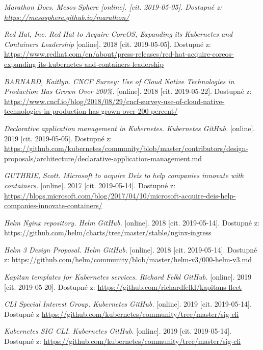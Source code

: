 \begin{thebibliography}{10}
	\emph{Marathon Docs. Mesos Sphere [online]. [cit. 2019-05-05]. Dostupné z: \url{https://mesosphere.github.io/marathon/}}
    
    \emph{Red Hat, Inc. Red Hat to Acquire CoreOS, Expanding its Kubernetes and Containers Leadership} [online]. 2018 [cit. 2019-05-05]. Dostupné z: \url{https://www.redhat.com/en/about/press-releases/red-hat-acquire-coreos-expanding-its-kubernetes-and-containers-leadership}  

    \emph{BARNARD, Kaitlyn. CNCF Survey: Use of Cloud Native Technologies in Production Has Grown Over 200\%.} [online]. 2018 [cit. 2019-05-22]. Dostupné z: \url{https://www.cncf.io/blog/2018/08/29/cncf-survey-use-of-cloud-native-technologies-in-production-has-grown-over-200-percent/}

    \emph{Declarative application management in Kubernetes. Kubernetes GitHub.} [online]. 2019 [cit. 2019-05-05]. Dostupné z: \url{https://github.com/kubernetes/community/blob/master/contributors/design-proposals/architecture/declarative-application-management.md}

    \emph{GUTHRIE, Scott. Microsoft to acquire Deis to help companies innovate with containers.} [online]. 2017 [cit. 2019-05-14]. Dostupné z: \url{https://blogs.microsoft.com/blog/2017/04/10/microsoft-acquire-deis-help-companies-innovate-containers/}

    \emph{Helm Nginx repository. Helm GitHub.} [online]. 2018 [cit. 2019-05-14]. Dostupné z: \url{https://github.com/helm/charts/tree/master/stable/nginx-ingress}        	
        	
    \emph{Helm 3 Design Proposal. Helm GitHub.} [online]. 2018 [cit. 2019-05-14]. Dostupné z: \url{https://github.com/helm/community/blob/master/helm-v3/000-helm-v3.md}
 	
    \emph{Kapitan templates for Kubernetes services. Richard Felkl GitHub.} [online]. 2019 [cit. 2019-05-20]. Dostupné z: \url{https://github.com/richardfelkl/kapitans-fleet}  

    \emph{CLI Special Interest Group. Kubernetes GitHub.} [online]. 2019 [cit. 2019-05-14]. Dostupné z \url{https://github.com/kubernetes/community/tree/master/sig-cli}

    \emph{Kubernetes SIG CLI. Kubernetes GitHub.} [online]. 2019 [cit. 2019-05-14]. Dostupné z: \url{https://github.com/kubernetes/community/tree/master/sig-cli}


\end{thebibliography}
